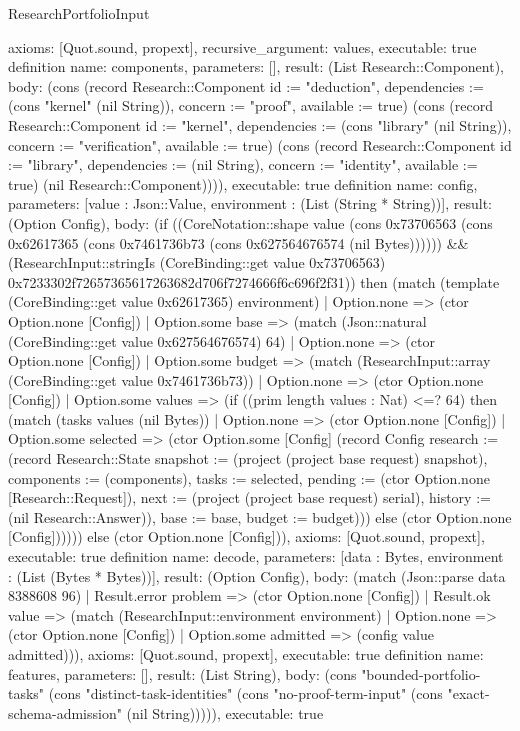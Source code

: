 \begin{lexlean}{ResearchPortfolioInput}
\begin{semanticmodule}
{ axioms: [Quot.sound, propext],
 recursive_argument: values,
 executable: true
}
definition{
 name: components,
 parameters: [],
 result: (List Research::Component),
 body: (cons (record Research::Component {id := "deduction", dependencies := (cons "kernel" (nil String)), concern := "proof", available := true}) (cons (record Research::Component {id := "kernel", dependencies := (cons "library" (nil String)), concern := "verification", available := true}) (cons (record Research::Component {id := "library", dependencies := (nil String), concern := "identity", available := true}) (nil Research::Component)))),
 executable: true
}
definition{
 name: config,
 parameters: [value : Json::Value, environment : (List (String * String))],
 result: (Option Config),
 body: (if ((CoreNotation::shape value (cons 0x73706563 (cons 0x62617365 (cons 0x7461736b73 (cons 0x627564676574 (nil Bytes)))))) && (ResearchInput::stringIs (CoreBinding::get value 0x73706563) 0x7233302f72657365617263682d706f7274666f6c696f2f31)) then (match (template (CoreBinding::get value 0x62617365) environment) | Option.none => (ctor Option.none [Config]) | Option.some base => (match (Json::natural (CoreBinding::get value 0x627564676574) 64) | Option.none => (ctor Option.none [Config]) | Option.some budget => (match (ResearchInput::array (CoreBinding::get value 0x7461736b73)) | Option.none => (ctor Option.none [Config]) | Option.some values => (if ((prim length values : Nat) <=? 64) then (match (tasks values (nil Bytes)) | Option.none => (ctor Option.none [Config]) | Option.some selected => (ctor Option.some [Config] (record Config {research := (record Research::State {snapshot := (project (project base request) snapshot), components := (components), tasks := selected, pending := (ctor Option.none [Research::Request]), next := (project (project base request) serial), history := (nil Research::Answer)}), base := base, budget := budget}))) else (ctor Option.none [Config]))))) else (ctor Option.none [Config])),
 axioms: [Quot.sound, propext],
 executable: true
}
definition{
 name: decode,
 parameters: [data : Bytes, environment : (List (Bytes * Bytes))],
 result: (Option Config),
 body: (match (Json::parse data 8388608 96) | Result.error problem => (ctor Option.none [Config]) | Result.ok value => (match (ResearchInput::environment environment) | Option.none => (ctor Option.none [Config]) | Option.some admitted => (config value admitted))),
 axioms: [Quot.sound, propext],
 executable: true
}
definition{
 name: features,
 parameters: [],
 result: (List String),
 body: (cons "bounded-portfolio-tasks" (cons "distinct-task-identities" (cons "no-proof-term-input" (cons "exact-schema-admission" (nil String))))),
 executable: true
}
\end{semanticmodule}
\end{lexlean}
